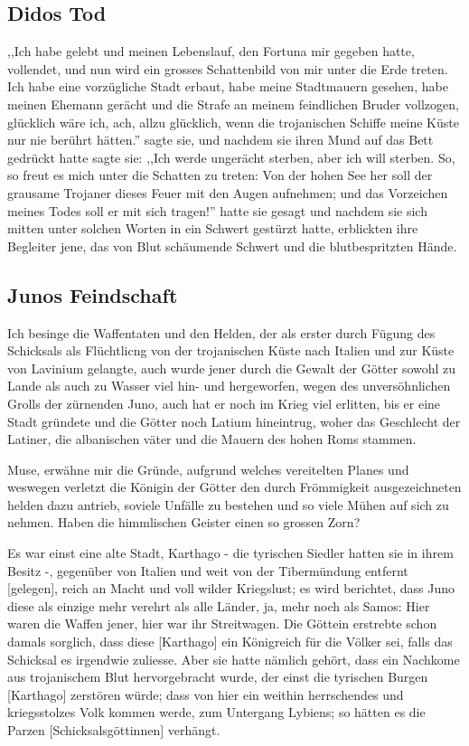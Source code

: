 \documentclass[a4paper]{article}
\begin{document}
\subsection{Didos Tod}
,,Ich habe gelebt und meinen Lebenslauf, den Fortuna mir gegeben hatte, vollendet, und nun wird ein grosses Schattenbild von mir unter die Erde treten. Ich habe eine vorzügliche Stadt erbaut, habe meine Stadtmauern gesehen, habe meinen Ehemann gerächt und die Strafe an meinem feindlichen Bruder vollzogen, glücklich wäre ich, ach, allzu glücklich, wenn die trojanischen Schiffe meine Küste nur nie berührt hätten.'' sagte sie, und nachdem sie ihren Mund auf das Bett gedrückt hatte sagte sie: ,,Ich werde ungerächt sterben, aber ich will sterben. So, so freut es mich unter die Schatten zu treten: Von der hohen See her soll der grausame Trojaner dieses Feuer mit den Augen aufnehmen; und das Vorzeichen meines Todes soll er mit sich tragen!'' hatte sie gesagt und nachdem sie sich mitten unter solchen Worten in ein Schwert gestürzt hatte, erblickten ihre Begleiter jene, das von Blut schäumende Schwert und die blutbespritzten Hände.

\subsection{Junos Feindschaft}
Ich besinge die Waffentaten und den Helden, der als erster durch Fügung des Schicksals als Flüchtlicng von der trojanischen Küste nach Italien und zur Küste von Lavinium gelangte, auch wurde jener durch die Gewalt der Götter sowohl zu Lande als auch zu Wasser viel hin- und hergeworfen, wegen des unversöhnlichen Grolls der zürnenden Juno, auch hat er noch im Krieg viel erlitten, bis er eine Stadt gründete und die Götter noch Latium hineintrug, woher das Geschlecht der Latiner, die albanischen väter und die Mauern des hohen Roms stammen.

Muse, erwähne mir die Gründe, aufgrund welches vereitelten Planes und weswegen verletzt die Königin der Götter den durch Frömmigkeit ausgezeichneten helden dazu antrieb, soviele Unfälle zu bestehen und so viele Mühen auf sich zu nehmen. Haben die himmlischen Geister einen so grossen Zorn?

Es war einst eine alte Stadt, Karthago - die tyrischen Siedler hatten sie in ihrem Besitz -, gegenüber von Italien und weit von der Tibermündung entfernt [gelegen], reich an Macht und voll wilder Kriegslust; es wird berichtet, dass Juno diese als einzige mehr verehrt als alle Länder, ja, mehr noch als Samos: Hier waren die Waffen jener, hier war ihr Streitwagen. Die Göttein erstrebte schon damals sorglich, dass diese [Karthago] ein Königreich für die Völker sei, falls das Schicksal es irgendwie zuliesse. Aber sie hatte nämlich gehört, dass ein Nachkome aus trojanischem Blut hervorgebracht wurde, der einst die tyrischen Burgen [Karthago] zerstören würde; dass von hier ein weithin herrschendes und kriegsstolzes Volk kommen werde, zum Untergang Lybiens; so hätten es die Parzen [Schicksalsgöttinnen] verhängt.
\end{document}
